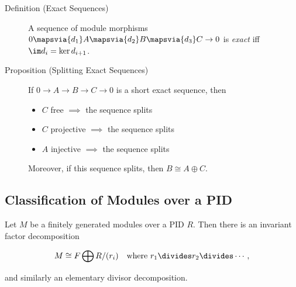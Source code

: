 \begin{description}
\item[Definition (Exact Sequences)]
A sequence of module morphisms
\(0 \mapsvia{d_1} A \mapsvia{d_2} B \mapsvia{d_3} C \to 0\) is
\emph{exact} iff \(\im d_i = \ker d_{i+1}\).
\item[Proposition (Splitting Exact Sequences)]
If \(0 \to A \to B \to C \to 0\) is a short exact sequence, then

\begin{itemize}
\tightlist
\item
  \(C\) free \(\implies\) the sequence splits
\item
  \(C\) projective \(\implies\) the sequence splits
\item
  \(A\) injective \(\implies\) the sequence splits
\end{itemize}

Moreover, if this sequence splits, then \(B \cong A \oplus C\).
\end{description}

\hypertarget{classification-of-modules-over-a-pid}{%
\subsection{Classification of Modules over a
PID}\label{classification-of-modules-over-a-pid}}

Let \(M\) be a finitely generated modules over a PID \(R\). Then there
is an invariant factor decomposition

\begin{align*}
M \cong F \bigoplus R/(r_i) \quad\text{where } r_1 \divides r_2 \divides \cdots
,\end{align*}

and similarly an elementary divisor decomposition.

